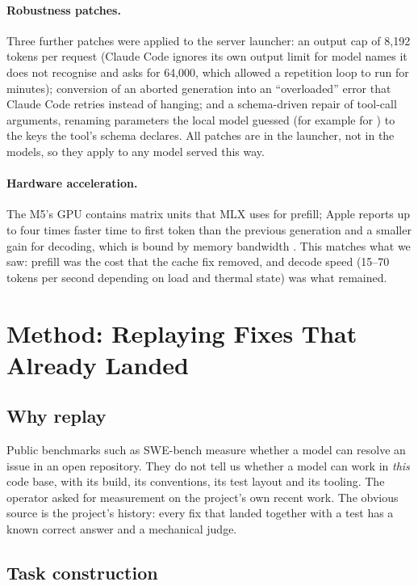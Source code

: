\paragraph{Robustness patches.} Three further patches were applied to the server launcher: an output cap of 8{,}192
tokens per request (Claude Code ignores its own output limit for model names it does not recognise and asks for
64{,}000, which allowed a repetition loop to run for minutes); conversion of an aborted generation into an
``overloaded'' error that Claude Code retries instead of hanging; and a schema-driven repair of tool-call arguments,
renaming parameters the local model guessed (for example  for ) to the keys the tool's
schema declares. All patches are in the launcher, not in the models, so they apply to any model served this way.

\paragraph{Hardware acceleration.} The M5's GPU contains matrix units that MLX uses for prefill; Apple reports up to
four times faster time to first token than the previous generation and a smaller gain for decoding, which is bound by
memory bandwidth \citep{Apple-2026aa}. This matches what we saw: prefill was the cost that the cache fix removed, and
decode speed (15--70 tokens per second depending on load and thermal state) was what remained.

\section{Method: Replaying Fixes That Already Landed}\label{sec:method}

\subsection{Why replay}

Public benchmarks such as SWE-bench \citep{Jimenez-2024aa} measure whether a model can resolve an issue in an open
repository. They do not tell us whether a model can work in \emph{this} code base, with its build, its conventions,
its test layout and its tooling. The operator asked for measurement on the project's own recent work. The obvious
source is the project's history: every fix that landed together with a test has a known correct answer and a
mechanical judge.

\subsection{Task construction}

